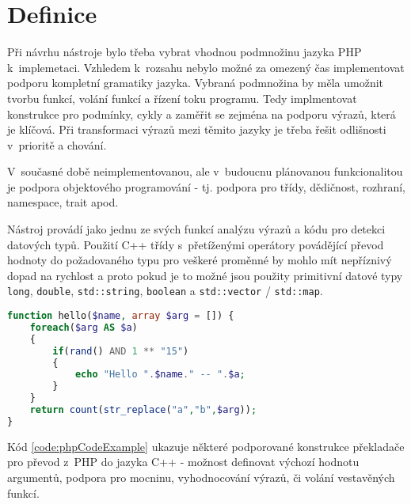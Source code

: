 \documentclass[czech]{ExcelAtFIT}
\newcommand{\function}[1]{\texttt{#1}}
\begin{document}
\section{Definice}

	Při návrhu nástroje bylo třeba vybrat vhodnou podmnožinu jazyka PHP k~implemetaci. Vzhledem k~rozsahu nebylo možné za omezený čas implementovat podporu kompletní gramatiky jazyka. Vybraná podmnožina by měla umožnit tvorbu funkcí, volání funkcí a řízení toku programu. Tedy implmentovat konstrukce pro podmínky, cykly a zaměřit se zejména na podporu výrazů, která je klíčová. Při transformaci výrazů mezi těmito jazyky je třeba řešit odlišnosti v~prioritě a chování.

	V~současné době neimplementovanou, ale v~budoucnu plánovanou funkcionalitou je podpora objektového programování - tj. podpora pro třídy, dědičnost, rozhraní, namespace, trait apod.

	Nástroj provádí jako jednu ze svých funkcí analýzu výrazů a kódu pro detekci datových typů. Použití C++ třídy s~přetíženými operátory povádějící převod hodnoty do požadovaného typu pro veškeré proměnné by mohlo mít nepříznivý dopad na rychlost a proto pokud je to možné jsou použity primitivní datové typy \function{long}, \function{double}, \function{std::string}, \function{boolean} a \function{std::vector} / \function{std::map}.

\begin{lstlisting}[caption=Podporované výrazy PHP, label=code:phpCodeExample, language=PHP]
function hello($name, array $arg = []) {
	foreach($arg AS $a)
	{
		if(rand() AND 1 ** "15")
		{
			echo "Hello ".$name." -- ".$a;
		}
	}
	return count(str_replace("a","b",$arg));
}
\end{lstlisting}

	Kód \ref{code:phpCodeExample} ukazuje některé podporované konstrukce překladače pro převod z~PHP do jazyka C++ - možnost definovat výchozí hodnotu argumentů, podpora pro mocninu, vyhodnocování výrazů, či volání vestavěných funkcí.



\end{document}
